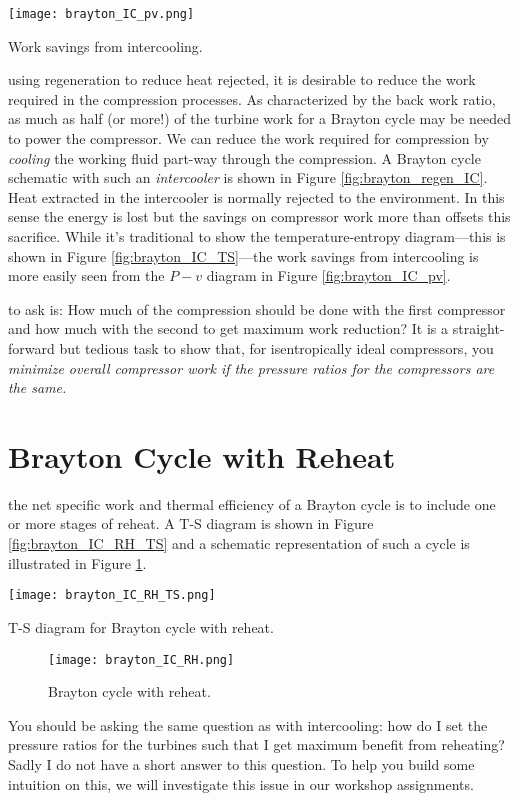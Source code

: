 \begin{marginfigure}
\texttt{[image: brayton\_IC\_pv.png]}
\caption{Work savings from intercooling.}
\label{fig:brayton_IC_pv}
\end{marginfigure}
 using regeneration to reduce heat rejected, it is desirable to reduce the work required in the compression processes.  As characterized by the back work ratio, as much as half (or more!) of the turbine work for a Brayton cycle may be needed to power the compressor.  We can reduce the work required for compression by \emph{cooling} the working fluid part-way through the compression.  A Brayton cycle schematic with such an \emph{intercooler} is shown in Figure \ref{fig:brayton_regen_IC}. Heat extracted in the intercooler is normally rejected to the environment.  In this sense the energy is lost but the savings on compressor work more than offsets this sacrifice.  While it's traditional to show the temperature-entropy diagram---this is shown in Figure \ref{fig:brayton_IC_TS}---the work savings from intercooling is more easily seen from the $P-v$ diagram in Figure \ref{fig:brayton_IC_pv}. 



 to ask is: How much of the compression should be done with the first compressor and how much with the second to get maximum work reduction?  It is a straight-forward but tedious task to show that, for isentropically ideal compressors, you \emph{minimize overall compressor work if the pressure ratios for the compressors are the same.}  


\section{Brayton Cycle with Reheat}


 the net specific work and thermal efficiency of a Brayton cycle is to include one or more stages of reheat.  A T-S diagram is shown in Figure \ref{fig:brayton_IC_RH_TS} and a schematic representation of such a cycle is illustrated in Figure \ref{fig:brayton_IC_RH}.
\begin{marginfigure}
\texttt{[image: brayton\_IC\_RH\_TS.png]}
\caption{T-S diagram for Brayton cycle with reheat.}
\label{fig:brayton_IC_RH_TS}
\end{marginfigure}

\begin{figure}
\texttt{[image: brayton\_IC\_RH.png]}
\caption{Brayton cycle with reheat.}
\label{fig:brayton_IC_RH}
\end{figure}

You should be asking the same question as with intercooling: how do I set the pressure ratios for the turbines such that I get maximum benefit from reheating?  Sadly I do not have a short answer to this question. To help you build some intuition on this, we will investigate this issue in our workshop assignments.


